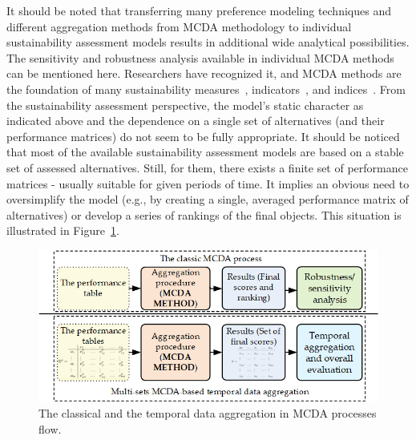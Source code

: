 \documentclass[final,5p,times,twocolumn,authoryear]{elsarticle}
\begin{document}
It should be noted that transferring many preference modeling techniques and different aggregation methods from MCDA methodology to individual sustainability assessment models results in additional wide analytical possibilities. The sensitivity and robustness analysis available in individual MCDA methods can be mentioned here. Researchers have recognized it, and MCDA methods are the foundation of many sustainability measures~\citep{khan2020sustainability}, indicators~\citep{gwerder2019life}, and indices~\citep{boggia2018spatial}. From the sustainability assessment perspective, the model's static character as indicated above and the dependence on a single set of alternatives (and their performance matrices) do not seem to be fully appropriate. It should be noticed that most of the available sustainability assessment models are based on a stable set of assessed alternatives. Still, for them, there exists a finite set of performance matrices - usually suitable for given periods of time. It implies an obvious need to oversimplify the model (e.g., by creating a single, averaged performance matrix of alternatives) or develop a series of rankings of the final objects. This situation is illustrated in Figure~\ref{fig:frameworkZero}. 
%
\begin{figure}[H]
    \centering
    \includegraphics[width=\linewidth]{Fig0Daria.png}
    \caption{The classical and the temporal data aggregation in MCDA processes flow.}
    \label{fig:frameworkZero}
\end{figure}
\end{document}
